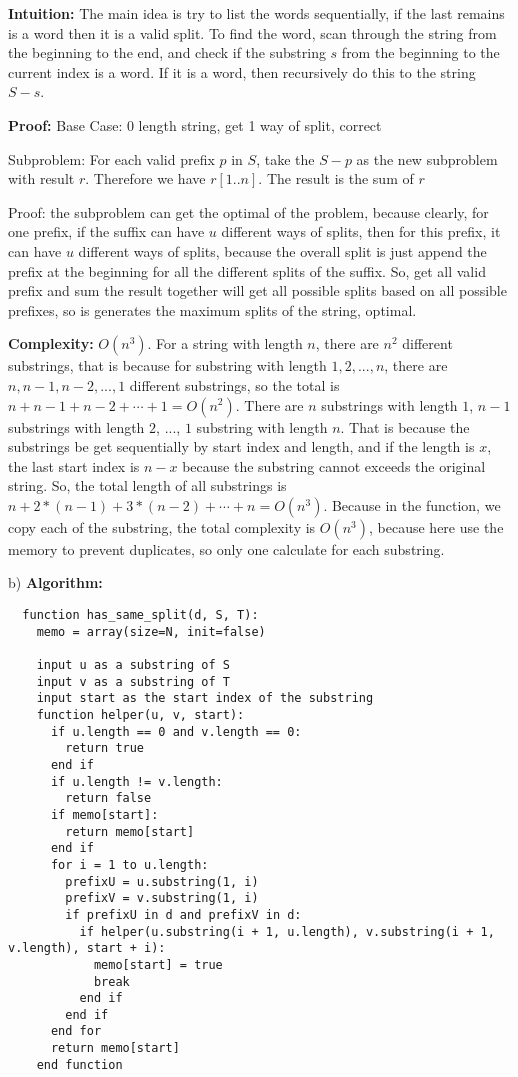 \documentclass{article}
\newcounter{problem}
\begin{document}
\begin{enumerate}[topsep=0pt]
\textbf{Intuition:}
The main idea is try to list the words sequentially, if the last remains is a word then it is a valid split.
To find the word, scan through the string from the beginning to the end, 
and check if the substring $s$ from the beginning to the current index is a word.
If it is a word, then recursively do this to the string $S-s$.

\textbf{Proof:}
Base Case: 0 length string,  get 1 way of split, correct

Subproblem: For each valid prefix $p$ in $S$, take the $S-p$ as the new subproblem with result $r$.
Therefore we have $r[1..n]$. The result is the sum of $r$

Proof: the subproblem can get the optimal of the problem,
because clearly, for one prefix, if the suffix can have $u$ different ways of splits,
then for this prefix, it can have $u$ different ways of splits, because the overall split
is just append the prefix at the beginning for all the different splits of the suffix.
So, get all valid prefix and sum the result together will get all possible splits based on all possible prefixes,
so is generates the maximum splits of the string, optimal.

\textbf{Complexity:}
$O(n^3)$. For a string with length $n$, there are $n^2$ different substrings,
that is because for substring with length $1,2,...,n$, there are $n,n-1,n-2,...,1$ different substrings,
so the total is $n+n-1+n-2+\cdots+1=O(n^2)$.
There are $n$ substrings with length $1$, $n-1$ substrings with length $2$, $...$, $1$ substring with length $n$.
That is because the substrings be get sequentially by start index and length,
and if the length is $x$, the last start index is $n-x$ because the substring cannot exceeds the original string.
So, the total length of all substrings is $n+2*(n-1)+3*(n-2)+\cdots+n=O(n^3)$.
Because in the function, we copy each of the substring, the total complexity is $O(n^3)$,
because here use the memory to prevent duplicates, so only one calculate for each substring.

b) \textbf{Algorithm:}
\begin{verbatim}
  function has_same_split(d, S, T):
    memo = array(size=N, init=false)

    input u as a substring of S
    input v as a substring of T
    input start as the start index of the substring
    function helper(u, v, start):
      if u.length == 0 and v.length == 0:
        return true
      end if
      if u.length != v.length:
        return false
      if memo[start]:
        return memo[start]
      end if
      for i = 1 to u.length:
        prefixU = u.substring(1, i)
        prefixV = v.substring(1, i)
        if prefixU in d and prefixV in d:
          if helper(u.substring(i + 1, u.length), v.substring(i + 1, v.length), start + i):
            memo[start] = true
            break
          end if
        end if
      end for
      return memo[start]
    end function
  

\end{verbatim}
\end{enumerate}
\end{document}
